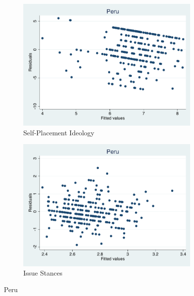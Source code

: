 \documentclass[12pt, titlepage]{article}
\begin{document}
\begin{figure}[H]
	\centering
	\begin{subfigure}[b]{0.475\textwidth}   
		\centering 
		\includegraphics[width=\textwidth]{Residuals/CountryIdeo/Peru}
		\caption{Self-Placement Ideology}
	\end{subfigure}
	\hfill
	\begin{subfigure}[b]{0.475\textwidth}
		\centering 
		\includegraphics[width=\textwidth]{Residuals/CountryLib/Peru}
		\caption{Issue Stances}
	\end{subfigure}
	\caption{Peru}
	\label{Peru}
\end{figure}
\end{document}
